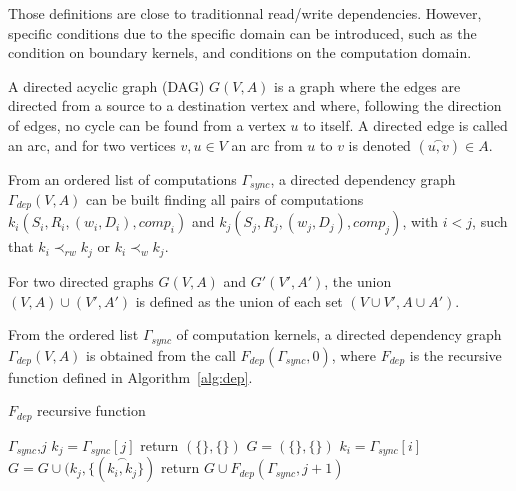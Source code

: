 Those definitions are close to traditionnal read/write dependencies. However, specific conditions due to the specific domain can be introduced, such as the condition on boundary kernels, and conditions on the computation domain.

\begin{mydef}
A directed acyclic graph (DAG) $G(V,A)$ is a graph where the edges are directed from a source to a destination vertex and where, following the direction of edges, no cycle can be found from a vertex $u$ to itself. A directed edge is called an arc, and for two vertices $v,u \in V$ an arc from $u$ to $v$ is denoted $(\overset{\frown}{u,v}) \in A$.
\end{mydef}

From an ordered list of computations $\Gamma_{sync}$, a directed dependency graph $\Gamma_{dep}(V,A)$ can be built finding all pairs of computations $k_i(S_i,R_i,(w_i,D_i),comp_i)$ and $k_j(S_j,R_j,(w_j,D_j),comp_j)$, with $i<j$, such that $k_i \prec_{rw} k_j$ or $k_i \prec_w k_j$. 

\begin{mydef}
For two directed graphs $G(V,A)$ and $G'(V',A')$, the union $(V,A)\cup (V',A')$ is defined as the union of each set $(V\cup V', A \cup A')$.
\end{mydef}

\begin{mydef}
From the ordered list $\Gamma_{sync}$ of computation kernels, a directed dependency graph $\Gamma_{dep}(V,A)$ is obtained from the call $F_{dep}(\Gamma_{sync},0)$, where $F_{dep}$ is the recursive function defined in Algorithm~\ref{alg:dep}.

\end{mydef}

\begin{algorithm}
\caption{$F_{dep}$ recursive function}
\label{alg:dep}
\begin{algorithmic}[1]
 {$\Gamma_{sync}$,$j$}
\State $k_j = \Gamma_{sync}[j]$
\State return $(\{\},\{\})$
\State $G=(\{\},\{\})$
\State $k_i = \Gamma_{sync}[i]$
\State $G = G \cup (k_j, \{(\overset{\frown}{k_i,k_j} \})$
\EndIf
\EndFor
\State return $G \cup F_{dep}(\Gamma_{sync},j+1)$
\EndIf
\EndProcedure
\end{algorithmic}
\end{algorithm}


